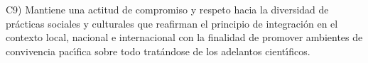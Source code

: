 C9) Mantiene una actitud de compromiso y respeto hacia la diversidad
de pr\'{a}cticas sociales y culturales que reafirman el principio de
integraci\'{o}n en el contexto local, nacional e internacional con la
finalidad de promover ambientes de convivencia pac\'{\i}fica sobre todo
trat\'{a}ndose de los adelantos cient\'{\i}ficos.
